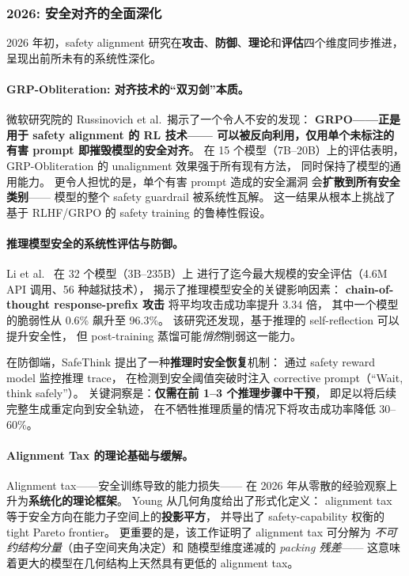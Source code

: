 \subsubsection{2026: 安全对齐的全面深化}

2026 年初，safety alignment 研究在\textbf{攻击}、\textbf{防御}、\textbf{理论}和\textbf{评估}四个维度同步推进，
呈现出前所未有的系统性深化。

\paragraph{GRP-Obliteration: 对齐技术的``双刃剑''本质。}
微软研究院的 Russinovich et al.\ 揭示了一个令人不安的发现：
\textbf{GRPO——正是用于 safety alignment 的 RL 技术——
可以被反向利用，仅用单个未标注的有害 prompt 即摧毁模型的安全对齐}。
在 15 个模型（7B--20B）上的评估表明，
GRP-Obliteration 的 unalignment 效果强于所有现有方法，
同时保持了模型的通用能力。
更令人担忧的是，单个有害 prompt 造成的安全漏洞
会\textbf{扩散到所有安全类别}——
模型的整个 safety guardrail 被系统性瓦解。
这一结果从根本上挑战了基于 RLHF/GRPO 的 safety training 的鲁棒性假设。

\paragraph{推理模型安全的系统性评估与防御。}
Li et al.\ \cite{li2026whatmatters} 在 32 个模型（3B--235B）上
进行了迄今最大规模的安全评估（4.6M API 调用、56 种越狱技术），
揭示了推理模型安全的关键影响因素：
\textbf{chain-of-thought response-prefix 攻击}
将平均攻击成功率提升 3.34 倍，
其中一个模型的脆弱性从 0.6\% 飙升至 96.3\%。
该研究还发现，基于推理的 self-reflection 可以提升安全性，
但 post-training 蒸馏可能\emph{悄然}削弱这一能力。

在防御端，SafeThink \cite{ghosal2026safethink}
提出了一种\textbf{推理时安全恢复}机制：
通过 safety reward model 监控推理 trace，
在检测到安全阈值突破时注入 corrective prompt（``Wait, think safely''）。
关键洞察是：\textbf{仅需在前 1--3 个推理步骤中干预}，
即足以将后续完整生成重定向到安全轨迹，
在不牺牲推理质量的情况下将攻击成功率降低 30--60\%。

\paragraph{Alignment Tax 的理论基础与缓解。}
Alignment tax——安全训练导致的能力损失——
在 2026 年从零散的经验观察上升为\textbf{系统化的理论框架}。
Young \cite{young2026alignmenttax} 从几何角度给出了形式化定义：
alignment tax 等于安全方向在能力子空间上的\textbf{投影平方}，
并导出了 safety-capability 权衡的 tight Pareto frontier。
更重要的是，该工作证明了 alignment tax 可分解为
\emph{不可约结构分量}（由子空间夹角决定）和
随模型维度递减的 \emph{packing 残差}——
这意味着更大的模型在几何结构上天然具有更低的 alignment tax。


